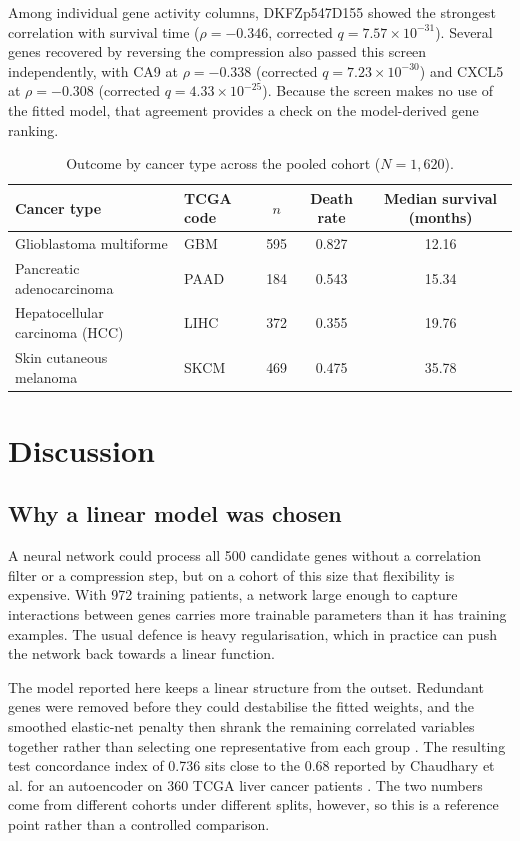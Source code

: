 \documentclass[10pt,a4paper]{article}
\begin{document}
Among individual gene activity columns, DKFZp547D155 showed the strongest
correlation with survival time ($\rho = -0.346$, corrected
$q = 7.57 \times 10^{-31}$). Several genes recovered by reversing the compression
also passed this screen independently, with CA9 at $\rho = -0.338$ (corrected
$q = 7.23 \times 10^{-30}$) and CXCL5 at $\rho = -0.308$ (corrected
$q = 4.33 \times 10^{-25}$). Because the screen makes no use of the fitted model,
that agreement provides a check on the model-derived gene ranking.

\begin{table}[!htbp]
\centering
\caption{Outcome by cancer type across the pooled cohort ($N = 1{,}620$).}
\label{tab:cancer_outcomes}
\begin{tabular}{llccc}
\toprule
Cancer type & TCGA code & $n$ & Death rate & Median survival (months) \\
\midrule
Glioblastoma multiforme      & GBM  & 595 & 0.827 & 12.16 \\
Pancreatic adenocarcinoma    & PAAD & 184 & 0.543 & 15.34 \\
Hepatocellular carcinoma (HCC) & LIHC & 372 & 0.355 & 19.76 \\
Skin cutaneous melanoma      & SKCM & 469 & 0.475 & 35.78 \\
\bottomrule
\end{tabular}
\end{table}

\section{Discussion}

\subsection{Why a linear model was chosen}

A neural network could process all 500 candidate genes without a correlation filter
or a compression step, but on a cohort of this size that flexibility is expensive.
With 972 training patients, a network large enough to capture interactions between
genes carries more trainable parameters than it has training examples. The usual
defence is heavy regularisation, which in practice can push the network back towards
a linear function.

The model reported here keeps a linear structure from the outset. Redundant genes
were removed before they could destabilise the fitted weights, and the smoothed
elastic-net penalty then shrank the remaining correlated variables together rather
than selecting one representative from each group \citep{zou2005regularization}.
The resulting test concordance index of 0.736 sits close to the 0.68 reported by
Chaudhary et al. for an autoencoder on 360 TCGA liver cancer patients
\citep{chaudhary2018deep}. The two numbers come from different cohorts under
different splits, however, so this is a reference point rather than a controlled
comparison.
\end{document}
